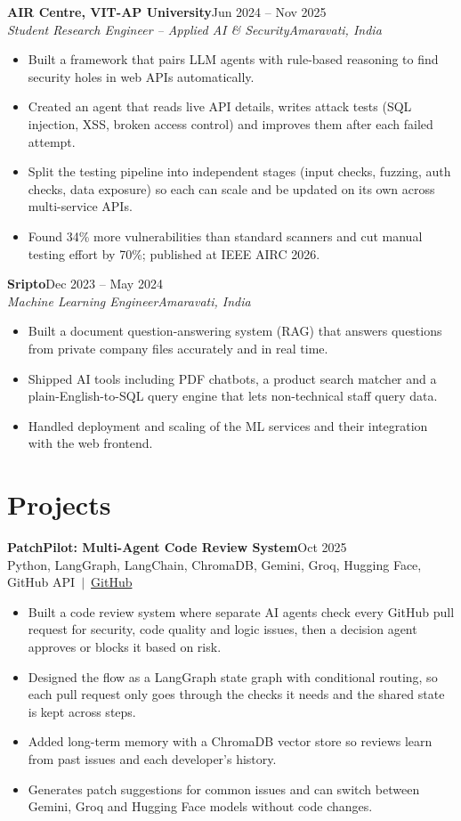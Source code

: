 \documentclass[a4paper,10pt]{article}
\newcommand{\job}[4]{\textbf{#1}\hfill #2\\\textit{#3}\hfill\textit{#4}\par\vspace{-2pt}}
\newcommand{\project}[3]{\textbf{#1}\hfill #2\\{\small #3}\par\vspace{-2pt}}
\newcommand{\gap}{\vspace{5pt}}
\begin{document}
\job{AIR Centre, VIT-AP University}{Jun 2024 -- Nov 2025}{Student Research Engineer -- Applied AI \& Security}{Amaravati, India}
\begin{itemize}
  \item Built a framework that pairs LLM agents with rule-based reasoning to find security holes in web APIs automatically.
  \item Created an agent that reads live API details, writes attack tests (SQL injection, XSS, broken access control) and improves them after each failed attempt.
  \item Split the testing pipeline into independent stages (input checks, fuzzing, auth checks, data exposure) so each can scale and be updated on its own across multi-service APIs.
  \item Found 34\% more vulnerabilities than standard scanners and cut manual testing effort by 70\%; published at IEEE AIRC 2026.
\end{itemize}
\gap

\job{Sripto}{Dec 2023 -- May 2024}{Machine Learning Engineer}{Amaravati, India}
\begin{itemize}
  \item Built a document question-answering system (RAG) that answers questions from private company files accurately and in real time.
  \item Shipped AI tools including PDF chatbots, a product search matcher and a plain-English-to-SQL query engine that lets non-technical staff query data.
  \item Handled deployment and scaling of the ML services and their integration with the web frontend.
\end{itemize}

\section{Projects}

\project{PatchPilot: Multi-Agent Code Review System}{Oct 2025}{Python, LangGraph, LangChain, ChromaDB, Gemini, Groq, Hugging Face, GitHub API \,$|$\, \href{https://github.com/nithin434/code_review}{GitHub}}
\begin{itemize}
  \item Built a code review system where separate AI agents check every GitHub pull request for security, code quality and logic issues, then a decision agent approves or blocks it based on risk.
  \item Designed the flow as a LangGraph state graph with conditional routing, so each pull request only goes through the checks it needs and the shared state is kept across steps.
  \item Added long-term memory with a ChromaDB vector store so reviews learn from past issues and each developer's history.
  \item Generates patch suggestions for common issues and can switch between Gemini, Groq and Hugging Face models without code changes.
\end{itemize}
\gap
\end{document}
